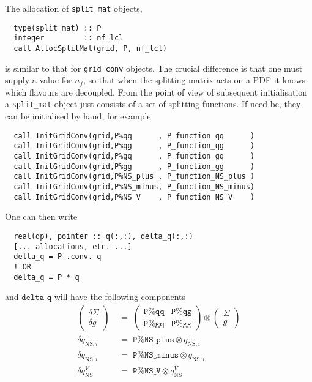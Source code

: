 \documentclass[12pt]{article}
\newcommand{\ttt}[1]{\texttt{#1}}
\begin{document}
The allocation of \ttt{split\_mat} objects,
\begin{lstlisting}
  type(split_mat) :: P
  integer         :: nf_lcl
  call AllocSplitMat(grid, P, nf_lcl)
\end{lstlisting}
is similar to that for \ttt{grid\_conv} objects. The crucial difference is
that one must supply a value for $n_f$, so that when the splitting
matrix acts on a PDF it knows which flavours are decoupled. From the
point of view of subsequent initialisation a \ttt{split\_mat} object
just consists of a set of splitting functions. 
If need be, they can be
initialised by hand, for example
\begin{lstlisting}
  call InitGridConv(grid,P%qq      , P_function_qq      )
  call InitGridConv(grid,P%qg      , P_function_qg      )
  call InitGridConv(grid,P%gq      , P_function_gq      )
  call InitGridConv(grid,P%gg      , P_function_gg      )
  call InitGridConv(grid,P%NS_plus , P_function_NS_plus )
  call InitGridConv(grid,P%NS_minus, P_function_NS_minus)
  call InitGridConv(grid,P%NS_V    , P_function_NS_V    )
\end{lstlisting}
One can then write
\begin{lstlisting}
  real(dp), pointer :: q(:,:), delta_q(:,:)
  [... allocations, etc. ...]
  delta_q = P .conv. q
  ! OR
  delta_q = P * q
\end{lstlisting}
and $\ttt{delta\_q}$ will have the following components
\begin{align}
  \label{eq:Pmat_on_q}
  \left(\!\!
    \begin{array}{c}
      \delta\Sigma\\
       \delta g
    \end{array}
  \!\!\right)
    \;&= \;
  \left(
    \begin{array}{cc}
      \ttt{P\%qq} & \ttt{P\%qg}\\
      \ttt{P\%gq} & \ttt{P\%gg}
    \end{array}
  \right) 
  \otimes
  \left(\!\!
    \begin{array}{c}
      \Sigma\\
       g
    \end{array}
    \!\!\right) 
  \nonumber\\[3pt]
%
  \delta q^+_{\mathrm{NS},i} \;&=\; \ttt{P\%NS\_plus} \otimes
  q^+_{\mathrm{NS},i}\\[3pt] 
%
  \delta q^-_{\mathrm{NS},i} \;&=\; \ttt{P\%NS\_minus} \otimes
  q^-_{\mathrm{NS},i}\nonumber \\[3pt]
% 
  \delta q^V_{\mathrm{NS}} \;&=\; \ttt{P\%NS\_V} \otimes
  q^V_{\mathrm{NS}} \nonumber
\end{align}
\end{document}
